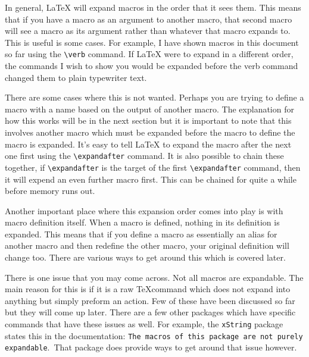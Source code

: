 In general, \LaTeX{} will expand macros in the order that it sees them. This means that if you have a macro as an argument to another macro, that second macro will see a macro as its argument rather than whatever that macro expands to. This is useful is some cases. For example, I have shown macros in this document so far using the \verb=\verb= command. If \LaTeX{} were to expand in a different order, the commands I wish to show you would be expanded before the verb command changed them to plain typewriter text. \par
There are some cases where this is not wanted. Perhaps you are trying to define a macro with a name based on the output of another macro. The explanation for how this works will be in the next section but it is important to note that this involves another macro which must be expanded before the macro to define the macro is expanded. It's easy to tell \LaTeX{} to expand the macro after the next one first using the \verb=\expandafter= command. It is also possible to chain these together, if \verb=\expandafter= is the target of the first \verb=\expandafter= command, then it will expend an even further macro first. This can be chained for quite a while before memory runs out. \par
Another important place where this expansion order comes into play is with macro definition itself. When a macro is defined, nothing in its definition is expanded. This means that if you define a macro as essentially an alias for another macro and then redefine the other macro, your original definition will change too. There are various ways to get around this which is covered later. \par
There is one issue that you may come across. Not all macros are expandable. The main reason for this is if it is a raw \TeX command which does not expand into anything but simply preform an action. Few of these have been discussed so far but they will come up later. There are a few other packages which have specific commands that have these issues as well. For example, the \texttt{xString} package states this in the documentation: \texttt{The macros of this package are not purely expandable}.\ That package does provide ways to get around that issue however.
